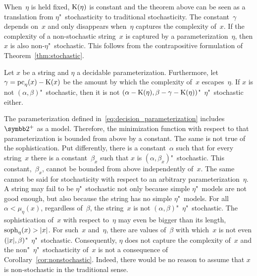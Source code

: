 When~$\eta$ is held fixed, $\operatorname{K}(\eta)$ is constant and the theorem above can be seen as a translation from $\eta$"~stochasticity to traditional stochasticity.
The constant~$\gamma$ depends on~$x$ and only disappears when~$\eta$ captures the complexity of~$x$.
If the complexity of a non-stochastic string~$x$ is captured by a parameterization~$\eta$, then $x$ is also non-$\eta$"~stochastic.
This follows from the contrapositive formulation of Theorem~\ref{thm:stochastic}.
\begin{corollary}
\label{cor:nonstochastic}%
  Let $x$ be a string and $\eta$ a decidable parameterization.
  Furthermore, let $\gamma = \operatorname{pc}_\eta(x) - \operatorname{K}(x)$ be the amount by which the complexity of~$x$ escapes~$\eta$.
  If $x$ is not $(\alpha, \beta)$"~stochastic, then it is not $(\alpha - \operatorname{K}(\eta), \beta - \gamma - \operatorname{K}(\eta))$"~$\eta$"~stochastic either.
\end{corollary}

The parameterization defined in~\eqref{eq:decision_parameterization} includes $\binary^+$ as a model.
Therefore, the minimization function with respect to that parameterization is bounded from above by a constant.
The same is not true of the sophistication.
Put differently, there is a constant~$\alpha$ such that for every string~$x$ there is a constant~$\beta_x$ such that $x$ is $(\alpha, \beta_x)$"~stochastic.
This constant,~$\beta_x$, cannot be bounded from above independently of~$x$.
The same cannot be said for stochasticity with respect to an arbitrary parameterization~$\eta$.
A string may fail to be $\eta$"~stochastic not only because simple $\eta$"~models are not good enough, but also because the string has no simple $\eta$"~models.
For all $\alpha < \mu_\eta(x)$, regardless of~$\beta$, the string~$x$ is not $(\alpha, \beta)$"~$\eta$"~stochastic.
The sophistication of~$x$ with respect to~$\eta$ may even be bigger than its length, $\operatorname{soph}_\eta(x) > {\lvert x\rvert}$.
For such~$x$ and~$\eta$, there are values of~$\beta$ with which~$x$ is not even $({\lvert x\rvert}, \beta)$"~$\eta$"~stochastic.
Consequently, $\eta$ does not capture the complexity of~$x$ and the non"~$\eta$"~stochasticity of~$x$ is not a consequence of Corollary~\ref{cor:nonstochastic}.
Indeed, there would be no reason to assume that $x$ is non-stochastic in the traditional sense.

